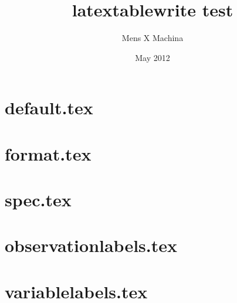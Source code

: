 \documentclass{article}
\begin{document}
\title{latextablewrite test}
\author{Mens X Machina}
\date{May 2012}
\maketitle

\section{default.tex}


\section{format.tex}


\section{spec.tex}


\section{observationlabels.tex}


\section{variablelabels.tex}

\end{document}
